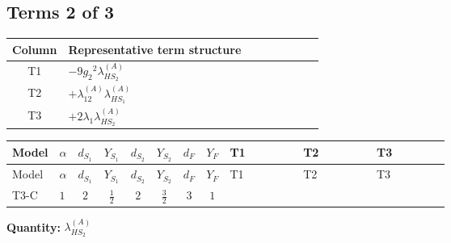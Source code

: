 \documentclass[8pt]{article}
\begin{document}
\begin{landscape}
\subsection*{Terms 2 of 3}
\begin{center}
\begin{tabular}{@{}c >{\raggedright\arraybackslash}p{0.82\linewidth}@{}}
\toprule
Column & Representative term structure \\
\midrule
T1 & \(\displaystyle -9 {g_2}^2 {\lambda_{HS_2}^{(A)}}\) \\
\midrule
T2 & \(\displaystyle +{\lambda_{12}^{(A)}} {\lambda_{HS_1}^{(A)}}\) \\
\midrule
T3 & \(\displaystyle +2 {\lambda_1} {\lambda_{HS_2}^{(A)}}\) \\
\midrule
\bottomrule
\end{tabular}
\end{center}
\smallskip
\tiny
\begin{longtable}{@{}llcccccc >{\raggedright\arraybackslash}p{0.21\linewidth} >{\raggedright\arraybackslash}p{0.21\linewidth} >{\raggedright\arraybackslash}p{0.21\linewidth}@{}}
\toprule
Model & $\alpha$ & $d_{S_1}$ & $Y_{S_1}$ & $d_{S_2}$ & $Y_{S_2}$ & $d_F$ & $Y_F$ & T1 & T2 & T3 \\
\midrule
\endfirsthead
\toprule
Model & $\alpha$ & $d_{S_1}$ & $Y_{S_1}$ & $d_{S_2}$ & $Y_{S_2}$ & $d_F$ & $Y_F$ & T1 & T2 & T3 \\
\midrule
\endhead
T3-C & $1$ & $2$ & $\frac{1}{2}$ & $2$ & $\frac{3}{2}$ & $3$ & $1$ & \scriptsize\adjustbox{max width=\linewidth}{$\begin{gathered} -9 {g_2}^2 {\lambda_{HS_2}^{(A)}}\end{gathered}$} & \scriptsize\adjustbox{max width=\linewidth}{$\begin{gathered} +{\lambda_{12}^{(A)}} {\lambda_{HS_1}^{(A)}}\end{gathered}$} & \scriptsize\adjustbox{max width=\linewidth}{$\begin{gathered} +2 {\lambda_1} {\lambda_{HS_2}^{(A)}}\end{gathered}$} \\
\midrule
\bottomrule
\end{longtable}
\clearpage
\noindent\textbf{Quantity: }$\lambda_{HS_2}^{(A)}$\par\smallskip

\end{landscape}
\end{document}

